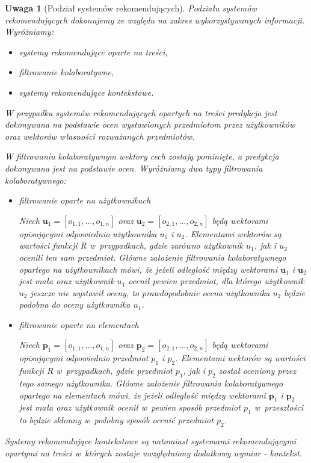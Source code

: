 \documentclass[12pt,a4paper]{report}
\newtheorem{uwaga}[df]{Uwaga}
\begin{document}
\begin{uwaga}[Podział systemów rekomendujących]
Podziału systemów rekomendujących dokonujemy ze względu na zakres wykorzystywanych informacji. Wyróżniamy:
\begin{itemize}
\item systemy rekomendujące oparte na treści,
\item filtrowanie kolaboratywne,
\item systemy rekomendujące kontekstowe.
\end{itemize}

W przypadku systemów rekomendujących opartych na treści predykcja jest dokonywana na podstawie ocen wystawionych przedmiotom przez użytkowników oraz wektorów własności rozważanych przedmiotów. 

W filtrowaniu kolaboratywnym wektory cech zostają pominięte, a predykcja dokonywana jest na podstawie ocen. Wyróżniamy dwa typy filtrowania kolaboratywnego:
\begin{itemize}
\item filtrowanie oparte na użytkownikach

Niech $\mathbf{u}_1 = [o_{1,1}, \ldots, o_{1,n}]$ oraz $\mathbf{u}_2 = [o_{2,1}, \ldots, o_{2,n}]$ będą wektorami opisującymi odpowiednio użytkownika $u_1$ i $u_2$. Elementami wektorów są wartości funkcji R w~przypadkach, gdzie zarówno użytkownik $u_1$, jak i $u_2$ ocenili ten sam przedmiot. Główne założenie filtrowania kolaboratywnego opartego na użytkownikach mówi, że jeżeli odległość między wektorami $\mathbf{u}_1$ i $\mathbf{u}_2$ jest mała oraz użytkownik $u_1$ ocenił pewien przedmiot, dla którego użytkownik $u_2$ jeszcze nie wystawił oceny, to prawdopodobnie ocena użytkownika $u_2$ będzie podobna do oceny użytkownika $u_1$.
\item filtrowanie oparte na elementach

Niech $\mathbf{p}_1 = [o_{1,1}, \ldots, o_{1,n}]$ oraz $\mathbf{p}_2 = [o_{2,1}, \ldots, o_{2,n}]$ będą wektorami opisującymi odpowiednio przedmiot $p_1$ i $p_2$. Elementami wektorów są wartości funkcji R w~przypadkach, gdzie przedmiot $p_1$, jak i $p_2$ został oceniony przez tego samego użytkownika. Główne założenie filtrowania kolaboratywnego opartego na elementach mówi, że jeżeli odległość między wektorami $\mathbf{p}_1$ i $\mathbf{p}_2$ jest mała oraz użytkownik ocenił w~pewien sposób przedmiot $p_1$ w~przeszłości to będzie skłonny w~podobny sposób ocenić przedmiot $p_2$.
\end{itemize}

Systemy rekomendujące kontekstowe są natomiast systemami rekomendującymi opartymi na treści w~których zostaje uwzględniony dodatkowy wymiar - kontekst.
\end{uwaga}
\end{document}
